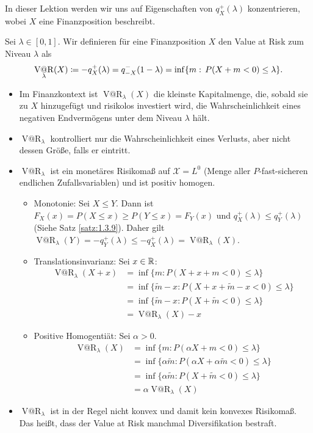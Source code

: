 \documentclass[a4paper,twoside,DIV15,BCOR12mm]{scrbook}
\makeatletter
\newcommand{\cX}{\mathcal X}
\DeclareMathOperator{\VatR}{V@R}
\makeatother
\begin{document}
In dieser Lektion werden wir uns auf Eigenschaften von $q_X^+(\lambda)$ konzentrieren, wobei $X$ eine Finanzposition beschreibt.

\begin{definition}
Sei $\lambda\in[0, 1]$. Wir definieren für eine Finanzposition $X$ den Value at Risk zum Niveau $\lambda$ als 
\[
\VatR_\lambda(X) \da -q_X^+(\lambda)=q_{-X}^-(1-\lambda)=\inf\{m:\,  P(X+m<0)\leq \lambda\}.
\]
\end{definition}

\begin{bemerkung}
\begin{itemize}
\item Im Finanzkontext ist $\VatR_\lambda(X)$ die kleinste Kapitalmenge, die, sobald sie zu $X$ hinzugefügt und risikolos investiert wird, die Wahrscheinlichkeit eines negativen Endvermögens unter dem Niveau $\lambda$ hält.
\item $\VatR_\lambda$ kontrolliert nur die Wahrscheinlichkeit eines Verlusts, aber nicht dessen Größe, falls er eintritt.
\item $\VatR_\lambda$ ist ein monetäres Risikomaß auf $\cX=L^0$ (Menge aller $P$-fast-sicheren endlichen Zufallsvariablen) und ist positiv homogen.
\begin{beweis}
\begin{itemize}
\item Monotonie: Sei $X\le Y$. Dann ist $F_X(x) = P(X\le x) \ge P(Y\le x) = F_Y(x)$ und $q_X^+(\lambda) \le q_Y^+(\lambda)$ (Siehe Satz \ref{satz:1.3.9}). Daher gilt $\VatR_\lambda(Y) = -q_Y^+(\lambda) \le -q_X^+(\lambda) = \VatR_\lambda(X)$.
\item Translationsinvarianz: Sei $x\in\mathbb{R}$: 
\begin{align*}
\VatR_\lambda(X+x) &= \inf\{m: P(X + x + m < 0) \le \lambda \} \\
&= \inf\{\tilde m - x : P(X + x + \tilde m -x < 0)\le \lambda \} \\
&= \inf\{\tilde m - x : P(X+\tilde m < 0 ) \le \lambda\} \\
&= \VatR_\lambda(X) - x
\end{align*}
\item Positive Homogentiät: Sei $\alpha>0$.
\begin{align*}
\VatR_\lambda(X) &= \inf\{m:P(\alpha X+m<0)\le \lambda\} \\
&= \inf\{\alpha\tilde m : P(\alpha X + \alpha\tilde m<0) \le \lambda\} \\
&= \inf\{\alpha\tilde m : P(X+\tilde m < 0 ) \le \lambda\} \\
&= \alpha\VatR_\lambda(X)
\end{align*}
\end{itemize}
\end{beweis}

\item $\VatR_\lambda$ ist in der Regel nicht konvex und damit kein konvexes Risikomaß. Das heißt, dass der Value at Risk manchmal Diversifikation bestraft.
\end{itemize}
\end{bemerkung}
\end{document}
